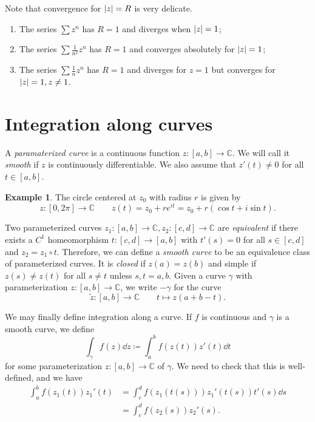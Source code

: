 \documentclass[leqno, openany]{memoir}
\theoremstyle{definition}
\newtheorem{exm}[thm]{Example}
\theoremstyle{remark}
\theoremstyle{plain}
\theoremstyle{definition}
\theoremstyle{remark}
\newcommand{\C}{\mathbb{C}}
\newcommand{\wt}[1]{\widetilde{#1}}
\begin{document}
Note that convergence for $\abs{z} = R$ is very delicate.  \begin{enumerate}
    \item The series $\sum z^n$ has $R = 1$ and diverges when $\abs{z} = 1$;
    \item The series $\sum \frac{1}{n^2} z^n$ has $R = 1$ and converges
        absolutely for $\abs{z} = 1$; \item The series $\sum \frac{1}{n} z^n$
has $R = 1$ and diverges for $z = 1$ but converges for $\abs{z} = 1, z \neq 1$.
\end{enumerate}

\section{Integration along curves}%

A \textit{paramaterized curve} is a continuous function $z \colon [a,b] \to
\C$. We will call it \textit{smooth} if $z$ is continuously differentiable. We
also assume that $z'(t) \neq 0$ for all $t \in [a,b]$.

\begin{exm} The circle centered at $z_0$ with radius $r$ is given by \[ z
\colon [0, 2\pi] \to \C \qquad z(t) = z_0 + re^{it} = z_0 + r (\cos t + i \sin
t). \] \end{exm} Two parameterized curves $z_1 \colon [a,b] \to \C, z_2 \colon
[c,d] \to \C$ are \textit{equivalent} if there exists a $C^1$ homeomorphism $t
\colon [c,d] \to [a,b]$ with $t'(s) = 0$ for all $s \in [c,d]$ and $z_2 = z_1
\circ t$. Therefore, we can define a \textit{smooth curve} to be an equivalence
class of parameterized curves. It is \textit{closed} if $z(a) = z(b)$ and
simple if $z(s) \neq z(t)$ for all $s \neq t$ unless $s,t = a,b$. Given a curve
$\gamma$ with parameterization $z \colon [a,b] \to \C$, we write $-\gamma$ for
the curve \[ \wt{z} \colon [a,b] \to \C \qquad t \mapsto z(a+b-t). \]

We may finally define integration along a curve. If $f$ is continuous and
$\gamma$ is a smooth curve, we define \[ \int_{\gamma} f(z) \dd{z} \coloneqq
\int_a^b f(z(t)) z'(t) \dd{t} \] for some parameterization $z \colon [a,b] \to
\C$ of $\gamma$. We need to check that this is well-defined, and we have
\begin{align*} \int_a^b f(z_1(t)) z_1'(t) &= \int_c^d f(z_1(t(s))) z_1'(t(s))
t'(s) \dd{s} \\ &= \int_c^d f(z_2(s)) z_2'(s).  \end{align*}
\end{document}
